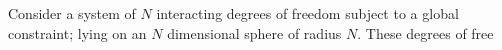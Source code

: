 Consider a system of $N$ interacting degrees of freedom subject to a global constraint; lying on an $N$ dimensional sphere of radius $N$. These degrees of free